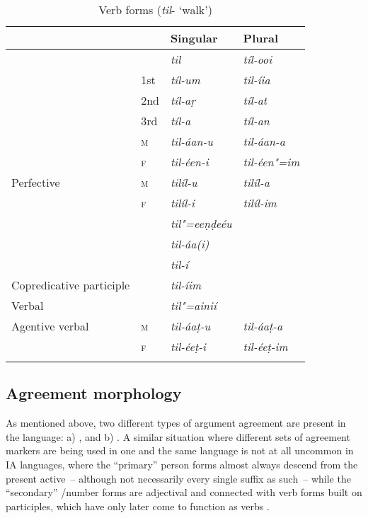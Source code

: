 \begin{table}[ht]
\caption{Verb forms (\textit{til}- `walk')}

\begin{tabularx}{\textwidth}{ Q l@{\hspace{20pt}} l@{\hspace{20pt}} l@{\hspace{20pt}} }
\lsptoprule
&
&
Singular &
Plural\\\hline
{} &
&
\textit{til} &
\textit{tíl-ooi} \\
 &
1st &
\textit{tíl-um} &
\textit{til-íia} \\
&
2nd &
\textit{tíl-aṛ} &
\textit{tíl-at} \\
&
3rd &
\textit{tíl-a} &
\textit{tíl-an} \\
 &
\textsc{m} &
\textit{til-áan-u} &
\textit{til-áan-a} \\
&
\textsc{f} &
\textit{til-éen-i} &
\textit{til-éen"=im} \\
Perfective &
\textsc{m} &
\textit{tilíl-u} &
\textit{tilíl-a} \\
&
\textsc{f} &
\textit{tilíl-i} &
\textit{tilíl-im} \\
 &
&
\textit{til"=eeṇḍeéu} &
\\
 &
&
\textit{til-áa(i)} &
\\
 &
&
\textit{til-í} &
\\
Copredicative participle &
&
\textit{til-íim} &
\\
Verbal  &
&
\textit{til"=ainií} &
\\
Agentive verbal  &
\textsc{m} &
\textit{til-áaṭ-u} &
\textit{til-áaṭ-a} \\
&
\textsc{f} &
\textit{til-éeṭ-i} &
\textit{til-éeṭ-im} 
\\\lspbottomrule
\end{tabularx}
\label{tab:8-15}
\end{table}


\subsection{Agreement morphology}
\label{subsec:8-4-1}

As mentioned above, two different types of argument agreement are present in the language: a) , and b) . A similar situation where different sets of agreement markers are being used in one and the same language is not at all uncommon in IA languages, where the ``primary'' person forms almost always descend from the  present active~-- although not necessarily every single suffix as such~-- while the ``secondary'' /number forms are adjectival and connected with verb forms built on participles, which have only later come to function as  verbs \citep[259--260]{masica1991}. 



